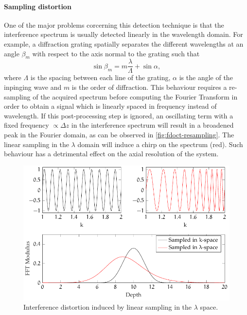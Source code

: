 \paragraph{Sampling distortion}
One of the major problems corcerning this detection technique is that the interference spectrum is usually detected linearly in the wavelength domain. For example, a diffraction grating spatially separates the different wavelengths at an angle $\beta_m$ with respect to the axis normal to the grating such that
\begin{equation}
	\sin\beta_m = m \frac{\lambda}{\Lambda} + \sin\alpha,
\end{equation}
where $\Lambda$ is the spacing between each line of the grating, $\alpha$ is the angle of the inpinging wave and $m$ is the order of diffraction. 
This behaviour requires a re-sampling of the acquired spectrum before computing the Fourier Transform in order to obtain a signal which is linearly spaced in frequency instead of wavelength. If this post-processing step is ignored, an oscillating term with a fixed frequency $\propto \Delta z$ in the interference spectrum will result in a broadened peak in the Fourier domain, as can be observed in \autoref{fig:fdoct-resampling}. The linear sampling in the $\lambda$ domain will induce a chirp on the spectrum (red). Such behaviour has a detrimental effect on the axial resolution of the system. 


\begin{figure}[hbt]
	\myfloatalign
	\includegraphics[width=0.95\linewidth]{gfx/tikz/fdoct-resampling}
	\caption{Interference distortion induced by linear sampling in the $\lambda$ space. }\label{fig:fdoct-resampling}
\end{figure}

